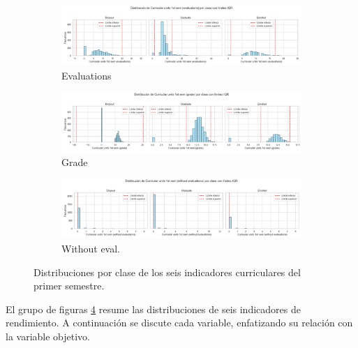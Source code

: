 \documentclass{report}[14pt]
\begin{document}
\begin{figure}[htbp]
  \begin{subfigure}[b]{.32\linewidth}
    \includegraphics[width=\linewidth]{distribution/Curricular units 1st sem (evaluations)_distribution.png}
    \caption{Evaluations}\label{fig:evaluations1}
  \end{subfigure}\hfill
  \begin{subfigure}[b]{.32\linewidth}
    \includegraphics[width=\linewidth]{distribution/Curricular units 1st sem (grade)_distribution.png}
    \caption{Grade}\label{fig:grade1}
  \end{subfigure}\hfill
  \begin{subfigure}[b]{.32\linewidth}
    \includegraphics[width=\linewidth]{distribution/Curricular units 1st sem (without evaluations)_distribution.png}
    \caption{Without eval.}\label{fig:witheval1}
  \end{subfigure}

  \caption{Distribuciones por clase de los seis indicadores curriculares del primer semestre.}
  \label{fig:curricular-1s}
\end{figure}


\FloatBarrier
El grupo de figuras \ref{fig:curricular-1s}  resume las distribuciones de seis indicadores de rendimiento.  A continuación se discute cada variable, enfatizando su relación con la variable objetivo.
\end{document}
